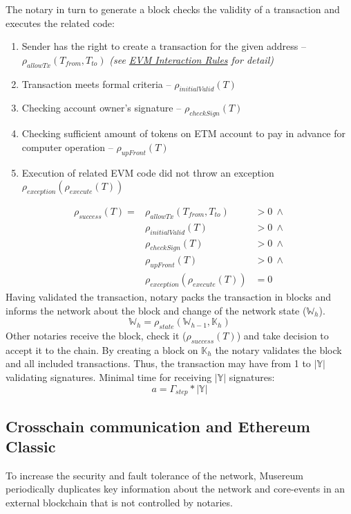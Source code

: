 \documentclass[12pt]{report}
\begin{document}
The notary in turn to generate a block checks the validity of a transaction and executes the related code:
\begin{enumerate}
\item Sender has the right to create a transaction for the given address – $\rho_{allowTx}(T_{from}, T_{to})$ \textit{(see \hyperref[tech-blockchain-rules]{EVM Interaction Rules} for detail)}
\item Transaction meets formal criteria – $\rho_{initialValid}(T)$
\item Checking account owner's signature – $\rho_{checkSign}(T)$
\item Checking sufficient amount of tokens on ETM account to pay in advance for computer operation – $\rho_{upFront}(T)$
\item Execution of related	EVM code	did not 	throw an exception $\rho_{exception}(\rho_{execute}(T))$
\end{enumerate}
\begin{align}
\rho_{success}(T) = 	&\rho_{allowTx}(T_{from}, T_{to}) &> 0 \ \wedge \\
 								&\rho_{initialValid}(T) &> 0 \ \wedge \\
								&\rho_{checkSign}(T) &> 0 \ \wedge \\
								&\rho_{upFront}(T) &> 0 \ \wedge \\
 								&\rho_{exception}(\rho_{execute}(T)) &= 0
\end{align}
Having validated the transaction, notary packs the transaction in blocks and informs the network about the block and change of the network state ($\mathbb{W}_h$).
\begin{equation}
\mathbb{W}_h = \rho_{state}(\mathbb{W}_{h-1}, \mathbb{K}_h)
\end{equation}
Other notaries receive the block, check it ($\rho_{success}(T)$) and take decision to accept it to the chain. By creating a block on $\mathbb{K}_h$ the notary validates the block and all included transactions.
Thus, the transaction may have from 1 to $|\mathbb{Y}|$ validating signatures.
Minimal time for receiving $|\mathbb{Y}|$ signatures:
\begin{equation}
a = \Gamma_{step} * |\mathbb{Y}|
\end{equation}

\subsection{Crosschain communication and Ethereum Classic}
\label{tech-blockchain-anchoring}
To increase the security and fault tolerance of the network, Musereum periodically duplicates key information about the network and core-events in an external blockchain that is not controlled by notaries.
\end{document}
